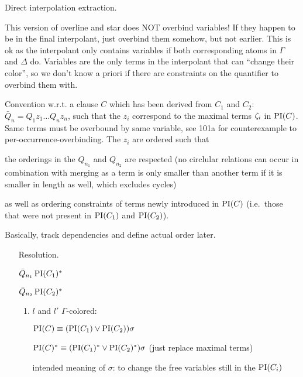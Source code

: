 \documentclass[,%
	paper=a4,%
	DIV14, 
	liststotoc,
	bibtotoc,
	draft=false,%
	numbers=noendperiod
]{scrartcl}
\begin{document}
\begin{defi}
	Direct interpolation extraction.

	This version of overline and star does NOT overbind variables! If they happen to be in the final interpolant, just overbind them somehow, but not earlier. This is ok as the interpolant only contains variables if both corresponding atoms in $\Gamma$ and $\Delta$ do. Variables are the only terms in the interpolant that can ``change their color'', so we don't know a priori if there are constraints on the quantifier to overbind them with.

	Convention w.r.t. a clause $C$ which has been derived from $C_1$ and $C_2$:
	$\bar Q_n = Q_1 z_1 \ldots Q_n z_n$, such that the $z_i$ correspond to the maximal terms $\zeta_{i}$ in $\operatorname{PI}(C)$. Same terms must be overbound by same variable, see 101a for counterexample to per-occurrence-overbinding.
	The $z_i$ are ordered such that
	\begin{compactenum}
	\item the orderings in the $Q_{n_1}$ and $Q_{n_2}$ are respected (no circlular relations can occur in combination with merging as a term is only smaller than another term if it is smaller in length as well, which excludes cycles) 
	\item as well as ordering constraints of terms newly introduced in $\operatorname{PI}(C)$ (i.e.~those that were not present in $\operatorname{PI}(C_1)$ and $\operatorname{PI}(C_2)$). 
	\end{compactenum}
	Basically, track dependencies and define actual order later.


	\begin{itemize}
		\item[Resolution.]~
			\begin{prooftree}
			\end{prooftree}

			$\bar Q_{n_1} \operatorname{PI}(C_1)^*$

			$\bar Q_{n_2} \operatorname{PI}(C_2)^* $

			\begin{enumerate}
				\item $l$ and $l'$ $\Gamma$-colored:

					$\operatorname{PI}(C) \equiv (\operatorname{PI}(C_1) \lor \operatorname{PI}(C_2))\sigma $

					$\operatorname{PI}(C)^* \equiv (\operatorname{PI}(C_1)^* \lor \operatorname{PI}(C_2)^*)\sigma $ (just replace maximal terms)

					intended meaning of $\sigma$: to change the free variables still in the $\operatorname{PI}(C_i)$


\end{enumerate}
\end{itemize}
\end{defi}
\end{document}
